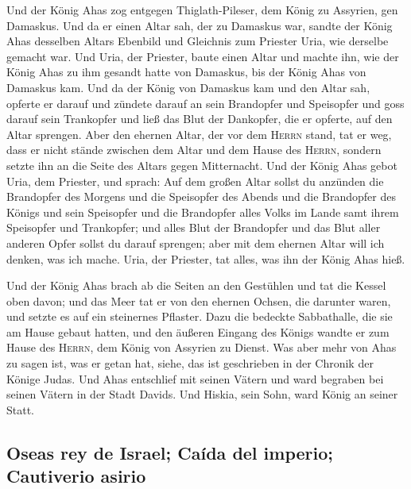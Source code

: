  Und der König Ahas zog entgegen Thiglath-Pileser, dem
König zu Assyrien, gen Damaskus. Und da er einen Altar sah, der zu
Damaskus war, sandte der König Ahas desselben Altars Ebenbild und
Gleichnis zum Priester Uria, wie derselbe gemacht war. 
Und Uria, der Priester, baute einen Altar und machte ihn, wie der König
Ahas zu ihm gesandt hatte von Damaskus, bis der König Ahas von Damaskus
kam.  Und da der König von Damaskus kam und den Altar
sah, opferte er darauf  und zündete darauf an sein
Brandopfer und Speisopfer und goss darauf sein Trankopfer und ließ das
Blut der Dankopfer, die er opferte, auf den Altar sprengen.
 Aber den ehernen Altar, der vor dem \textsc{Herrn}
stand, tat er weg, dass er nicht stände zwischen dem Altar und dem Hause
des \textsc{Herrn}, sondern setzte ihn an die Seite des Altars gegen
Mitternacht.  Und der König Ahas gebot Uria, dem
Priester, und sprach: Auf dem großen Altar sollst du anzünden die
Brandopfer des Morgens und die Speisopfer des Abends und die Brandopfer
des Königs und sein Speisopfer und die Brandopfer alles Volks im Lande
samt ihrem Speisopfer und Trankopfer; und alles Blut der Brandopfer und
das Blut aller anderen Opfer sollst du darauf sprengen; aber mit dem
ehernen Altar will ich denken, was ich mache.  Uria, der
Priester, tat alles, was ihn der König Ahas hieß.

 Und der König Ahas brach ab die Seiten an den Gestühlen
und tat die Kessel oben davon; und das Meer tat er von den ehernen
Ochsen, die darunter waren, und setzte es auf ein steinernes Pflaster.
 Dazu die bedeckte Sabbathalle, die sie am Hause gebaut
hatten, und den äußeren Eingang des Königs wandte er zum Hause des
\textsc{Herrn}, dem König von Assyrien zu Dienst.  Was
aber mehr von Ahas zu sagen ist, was er getan hat, siehe, das ist
geschrieben in der Chronik der Könige Judas.  Und Ahas
entschlief mit seinen Vätern und ward begraben bei seinen Vätern in der
Stadt Davids. Und Hiskia, sein Sohn, ward König an seiner Statt.

\hypertarget{oseas-rey-de-israel-cauxedda-del-imperio-cautiverio-asirio}{%
\subsection{Oseas rey de Israel; Caída del imperio; Cautiverio
asirio}\label{oseas-rey-de-israel-cauxedda-del-imperio-cautiverio-asirio}}

